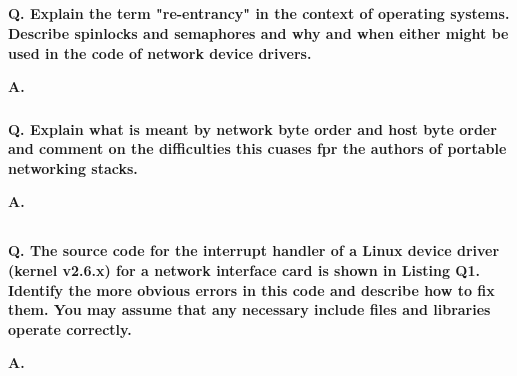 \subsection{}

\subsubsection{}

\textbf{Q. Explain the term "re-entrancy" in the context of operating
systems. Describe spinlocks and semaphores and why and when either might be used
in the code of network device drivers.}

\textbf{A.}

\subsubsection{}

\textbf{Q. Explain what is meant by network byte order and host byte order and comment on
the difficulties this cuases fpr the authors of portable networking stacks.}

\textbf{A.}

\subsection{}

\textbf{Q. The source code for the interrupt handler of a Linux device driver (kernel
v2.6.x) for a network interface card is shown in Listing Q1. Identify the more
obvious errors in this code and describe how to fix them. You may assume that
any necessary include files and libraries operate correctly.}

\textbf{A.}

